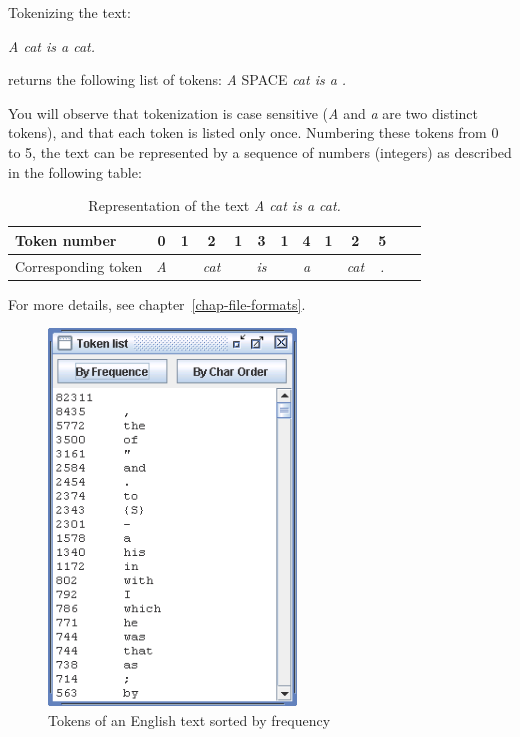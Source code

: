 \bigskip
\noindent Tokenizing the text:

\bigskip
\textit{A cat is a cat.}

\bigskip
\noindent returns the following list of tokens: \textit{A} SPACE \textit{cat is a .}

\bigskip
\noindent You will observe that tokenization is case sensitive (\textit{A} and
\textit{a} are two distinct tokens), and that each token is listed only once.
Numbering these tokens from 0 to 5, the text can be represented by a sequence of
numbers (integers) as described in the following table:

\bigskip
\begin{table}[h]
\begin{center}
\begin{tabular}{|p{2.8cm}||c|c|c|c|c|c|c|c|c|c|c|c|}
\hline
Token number               & 0 & 1 & 2 & 1 & 3 & 1 & 4 & 1 & 2 & 5
\\
\hline
Corresponding token & \textit{A} &   & \textit{cat} &   & \textit{is} &  & \textit{a}
& & \textit{cat} & \textit{.}
\\
\hline
\end{tabular}
\caption{Representation of the text \textit{A cat is a cat.}}
\end{center}
\end{table}

\bigskip
\noindent For more details, see chapter~\ref{chap-file-formats}.

\begin{figure}[!h]
\begin{center}
\includegraphics[height=10cm]{resources/img/fig2-12.png}
\caption{Tokens of an English text sorted by frequency}
\end{center}
\end{figure}




